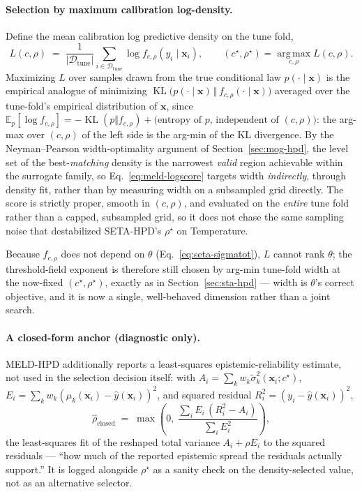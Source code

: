 \documentclass[11pt]{article}
\begin{document}
\paragraph{Selection by maximum calibration log-density.} Define the mean calibration log
predictive density on the tune fold,
\begin{equation}
L(c,\rho) \;=\; \frac{1}{|\mathcal D_{\mathrm{tune}}|}\sum_{i\in\mathcal D_{\mathrm{tune}}}
\log f_{c,\rho}(y_i\mid\bm x_i), \qquad (c^\star,\rho^\star) = \operatorname*{arg\,max}_{c,\rho}
L(c,\rho).
\label{eq:meld-logscore}
\end{equation}
Maximizing $L$ over samples drawn from the true conditional law $p(\cdot\mid\bm x)$ is the
empirical analogue of minimizing $\operatorname{KL}\big(p(\cdot\mid\bm x)\,\Vert\,f_{c,\rho}(\cdot
\mid\bm x)\big)$ averaged over the tune-fold's empirical distribution of $\bm x$, since
$\mathbb E_p[\log f_{c,\rho}] = -\operatorname{KL}(p\Vert f_{c,\rho}) + \text{(entropy of $p$,
independent of $(c,\rho)$)}$: the arg-max over $(c,\rho)$ of the left side is the arg-min of the
KL divergence. By the Neyman--Pearson width-optimality argument of Section~\ref{sec:mog-hpd}, the
level set of the best-\emph{matching} density is the narrowest \emph{valid} region achievable
within the surrogate family, so Eq.~\eqref{eq:meld-logscore} targets width \emph{indirectly},
through density fit, rather than by measuring width on a subsampled grid directly. The score is
strictly proper, smooth in $(c,\rho)$, and evaluated on the \emph{entire} tune fold rather than a
capped, subsampled grid, so it does not chase the same sampling noise that destabilized SETA-HPD's
$\rho^\star$ on Temperature.

Because $f_{c,\rho}$ does not depend on $\theta$ (Eq.~\eqref{eq:seta-sigmatot}), $L$ cannot rank
$\theta$; the threshold-field exponent is therefore still chosen by arg-min tune-fold width at
the now-fixed $(c^\star,\rho^\star)$, exactly as in Section~\ref{sec:sta-hpd} --- width is
$\theta$'s correct objective, and it is now a single, well-behaved dimension rather than a joint
search.

\paragraph{A closed-form anchor (diagnostic only).} MELD-HPD additionally reports a least-squares
epistemic-reliability estimate, not used in the selection decision itself: with
$A_i=\sum_k w_k\tilde\sigma_k^2(\bm x_i;c^\star)$, $E_i=\sum_k w_k(\mu_k(\bm x_i)-\hat y(\bm
x_i))^2$, and squared residual $R_i^2=(y_i-\hat y(\bm x_i))^2$,
\begin{equation}
\hat\rho_{\mathrm{closed}} \;=\; \max\!\left(0,\ \frac{\sum_i E_i\,(R_i^2-A_i)}{\sum_i
E_i^2}\right),
\label{eq:meld-rhohat}
\end{equation}
the least-squares fit of the reshaped total variance $A_i+\rho E_i$ to the squared residuals ---
``how much of the reported epistemic spread the residuals actually support.'' It is logged
alongside $\rho^\star$ as a sanity check on the density-selected value, not as an alternative
selector.
\end{document}
